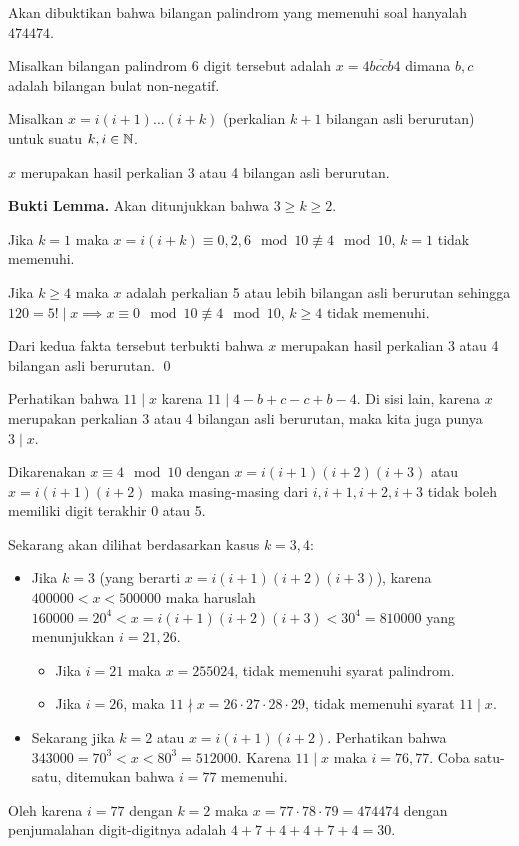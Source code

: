 
\begin{solusi}
    Akan dibuktikan bahwa bilangan palindrom yang memenuhi soal hanyalah $474474$.
    
    Misalkan bilangan palindrom 6 digit tersebut adalah $x=\overline{4bccb4}$ dimana $b,c$ adalah bilangan bulat non-negatif. 
    
    Misalkan $x = i(i+1)\dots(i+k)$ (perkalian $k+1$ bilangan asli berurutan) untuk suatu $k,i \in \mathbb N$. 
    
    \begin{lemma}
        $x$ merupakan hasil perkalian 3 atau 4 bilangan asli berurutan.
        
        \textbf{Bukti Lemma.}   Akan ditunjukkan bahwa $3 \ge k \ge 2$. 
        
        Jika $k = 1$ maka $x = i(i+k) \equiv 0, 2, 6 \mod 10 \not \equiv 4 \mod 10$, $k=1$ tidak memenuhi.
        
        Jika $k \ge 4$ maka $x$ adalah perkalian 5 atau lebih bilangan asli berurutan sehingga $120 = 5! \mid x \implies x \equiv 0 \mod 10 \not \equiv 4 \mod 10$, $k \ge 4$ tidak memenuhi. 
        
        Dari kedua fakta tersebut terbukti bahwa $x$ merupakan hasil perkalian 3 atau 4 bilangan asli berurutan. \qed
    \end{lemma}
    
    Perhatikan bahwa $11 \mid x$ karena $11 \mid 4-b+c-c+b-4$. Di sisi lain, karena $x$ merupakan perkalian 3 atau 4 bilangan asli berurutan, maka kita juga punya $3 \mid x$. 
    
    Dikarenakan $x \equiv 4 \mod 10$ dengan $x=i(i+1)(i+2)(i+3)$ atau $x=i(i+1)(i+2)$ maka masing-masing dari $i, i+1, i+2, i+3$  tidak boleh memiliki digit terakhir 0 atau 5. 

    Sekarang akan dilihat berdasarkan kasus $k=3,4$:
    \begin{itemize}
        \item Jika $k=3$ (yang berarti $x=i(i+1)(i+2)(i+3)$), karena $400000 < x < 500000$ maka haruslah $160000 = 20^4 < x=i(i+1)(i+2)(i+3) < 30^4 = 810000$ yang menunjukkan $i=21,26$.
        \begin{itemize}
            \item Jika $i=21$ maka $x=255024$, tidak memenuhi syarat palindrom. 
            \item Jika $i=26$, maka $11 \nmid x=26\cdot27\cdot28\cdot29$, tidak memenuhi syarat $11 \mid x$. 
        \end{itemize}
        \item Sekarang jika $k=2$ atau $x=i(i+1)(i+2)$. Perhatikan bahwa $343000 = 70^3 < x < 80^3 = 512000$. Karena $11\mid x$ maka $i=76,77$. Coba satu-satu, ditemukan bahwa $i=77$ memenuhi.
    \end{itemize}
    Oleh karena $i=77$ dengan $k=2$ maka $x=77\cdot78\cdot79=474474$ dengan penjumalahan digit-digitnya adalah $4+7+4+4+7+4=\boxed{30}$.
    
    

\end{solusi}